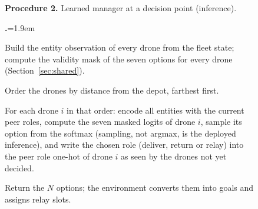 \documentclass[final,5p,times,twocolumn]{elsarticle}
\newcounter{procstep}
\newenvironment{procsteps}{\setcounter{procstep}{0}\begin{list}{\stepcounter{procstep}\textbf{\theprocstep.}}{\leftmargin=1.9em\itemsep=1.5pt\parsep=0pt\topsep=3pt}}{\end{list}}
\begin{document}
\begin{figure}[t]
\footnotesize
\noindent\textbf{Procedure 2.} Learned manager at a decision point (inference).
\begin{procsteps}
\item Build the entity observation of every drone from the fleet state; compute the validity mask
of the seven options for every drone (Section~\ref{sec:shared}).
\item Order the drones by distance from the depot, farthest first.
\item For each drone $i$ in that order: encode all entities with the current peer roles, compute
the seven masked logits of drone $i$, sample its option from the softmax (sampling, not argmax,
is the deployed inference), and write the chosen role (deliver, return or relay) into the peer
role one-hot of drone $i$ as seen by the drones not yet decided.
\item Return the $N$ options; the environment converts them into goals and assigns relay slots.
\end{procsteps}
\label{proc:learn}
\end{figure}
\end{document}
